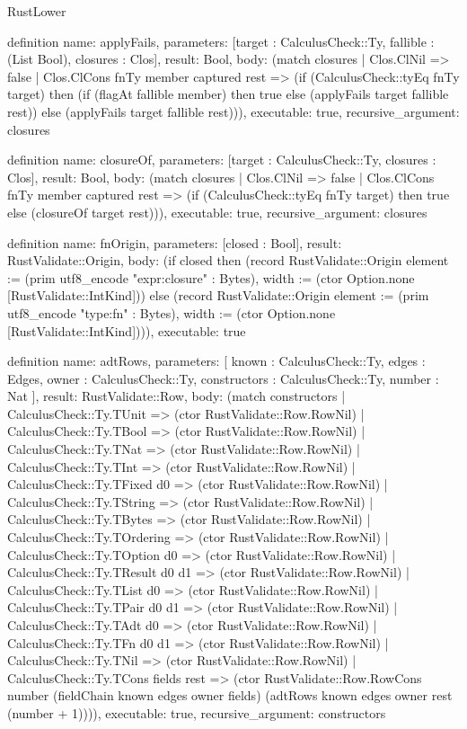 \begin{lexlean}{RustLower}
\begin{semanticmodule}
definition{
  name: applyFails,
  parameters: [target : CalculusCheck::Ty, fallible : (List Bool), closures : Clos],
  result: Bool,
  body: (match closures
    | Clos.ClNil => false
    | Clos.ClCons fnTy member captured rest => (if (CalculusCheck::tyEq fnTy target) then (if (flagAt fallible member) then true else (applyFails target fallible rest)) else (applyFails target fallible rest))),
  executable: true,
  recursive_argument: closures
}

definition{
  name: closureOf,
  parameters: [target : CalculusCheck::Ty, closures : Clos],
  result: Bool,
  body: (match closures
    | Clos.ClNil => false
    | Clos.ClCons fnTy member captured rest => (if (CalculusCheck::tyEq fnTy target) then true else (closureOf target rest))),
  executable: true,
  recursive_argument: closures
}

definition{
  name: fnOrigin,
  parameters: [closed : Bool],
  result: RustValidate::Origin,
  body: (if closed then (record RustValidate::Origin {element := (prim utf8_encode "expr:closure" : Bytes), width := (ctor Option.none [RustValidate::IntKind])}) else (record RustValidate::Origin {element := (prim utf8_encode "type:fn" : Bytes), width := (ctor Option.none [RustValidate::IntKind])})),
  executable: true
}

definition{
  name: adtRows,
  parameters: [
    known : CalculusCheck::Ty,
    edges : Edges,
    owner : CalculusCheck::Ty,
    constructors : CalculusCheck::Ty,
    number : Nat
  ],
  result: RustValidate::Row,
  body: (match constructors
    | CalculusCheck::Ty.TUnit => (ctor RustValidate::Row.RowNil)
    | CalculusCheck::Ty.TBool => (ctor RustValidate::Row.RowNil)
    | CalculusCheck::Ty.TNat => (ctor RustValidate::Row.RowNil)
    | CalculusCheck::Ty.TInt => (ctor RustValidate::Row.RowNil)
    | CalculusCheck::Ty.TFixed d0 => (ctor RustValidate::Row.RowNil)
    | CalculusCheck::Ty.TString => (ctor RustValidate::Row.RowNil)
    | CalculusCheck::Ty.TBytes => (ctor RustValidate::Row.RowNil)
    | CalculusCheck::Ty.TOrdering => (ctor RustValidate::Row.RowNil)
    | CalculusCheck::Ty.TOption d0 => (ctor RustValidate::Row.RowNil)
    | CalculusCheck::Ty.TResult d0 d1 => (ctor RustValidate::Row.RowNil)
    | CalculusCheck::Ty.TList d0 => (ctor RustValidate::Row.RowNil)
    | CalculusCheck::Ty.TPair d0 d1 => (ctor RustValidate::Row.RowNil)
    | CalculusCheck::Ty.TAdt d0 => (ctor RustValidate::Row.RowNil)
    | CalculusCheck::Ty.TFn d0 d1 => (ctor RustValidate::Row.RowNil)
    | CalculusCheck::Ty.TNil => (ctor RustValidate::Row.RowNil)
    | CalculusCheck::Ty.TCons fields rest => (ctor RustValidate::Row.RowCons number (fieldChain known edges owner fields) (adtRows known edges owner rest (number + 1)))),
  executable: true,
  recursive_argument: constructors
}


\end{semanticmodule}
\end{lexlean}
